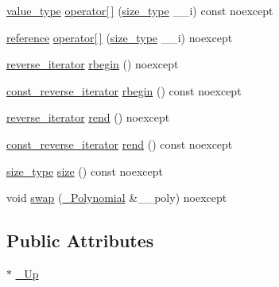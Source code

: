 \begin{DoxyCompactItemize}
\item 
\hyperlink{class____gnu__cxx_1_1__Polynomial_a725563351f50e76084a7a016c06f8a53}{value\+\_\+type} \hyperlink{class____gnu__cxx_1_1__Polynomial_adda717f35cc87205daf0ea7a16d5d1a7}{operator\mbox{[}$\,$\mbox{]}} (\hyperlink{class____gnu__cxx_1_1__Polynomial_a6afe219c123c7a2fdc5abac8a6639053}{size\+\_\+type} \+\_\+\+\_\+i) const noexcept
\item 
\hyperlink{class____gnu__cxx_1_1__Polynomial_accb3b4df60e4ad82d466173d54ea731a}{reference} \hyperlink{class____gnu__cxx_1_1__Polynomial_a999ee3c5a82fe4b2fa39b7a237ff2cbf}{operator\mbox{[}$\,$\mbox{]}} (\hyperlink{class____gnu__cxx_1_1__Polynomial_a6afe219c123c7a2fdc5abac8a6639053}{size\+\_\+type} \+\_\+\+\_\+i) noexcept
\item 
\hyperlink{class____gnu__cxx_1_1__Polynomial_aed8f7d97c575d5c34c54170631953415}{reverse\+\_\+iterator} \hyperlink{class____gnu__cxx_1_1__Polynomial_a10924e0d5e228684c721a4bba73a7af3}{rbegin} () noexcept
\item 
\hyperlink{class____gnu__cxx_1_1__Polynomial_a2a042a80127ab9a7b0349a54791e59af}{const\+\_\+reverse\+\_\+iterator} \hyperlink{class____gnu__cxx_1_1__Polynomial_ab5cd3c6e861ebf3adac38e3df4e099aa}{rbegin} () const noexcept
\item 
\hyperlink{class____gnu__cxx_1_1__Polynomial_aed8f7d97c575d5c34c54170631953415}{reverse\+\_\+iterator} \hyperlink{class____gnu__cxx_1_1__Polynomial_a8373c6b9a787a52798e4319906858d33}{rend} () noexcept
\item 
\hyperlink{class____gnu__cxx_1_1__Polynomial_a2a042a80127ab9a7b0349a54791e59af}{const\+\_\+reverse\+\_\+iterator} \hyperlink{class____gnu__cxx_1_1__Polynomial_abeca4b1cffc4a52db34375b99b6d3d11}{rend} () const noexcept
\item 
\hyperlink{class____gnu__cxx_1_1__Polynomial_a6afe219c123c7a2fdc5abac8a6639053}{size\+\_\+type} \hyperlink{class____gnu__cxx_1_1__Polynomial_aa0ae73f79d58962dc4f1e4df2d2cc0d2}{size} () const noexcept
\item 
void \hyperlink{class____gnu__cxx_1_1__Polynomial_aec8b248101f7340d46fbac13b07b45bc}{swap} (\hyperlink{class____gnu__cxx_1_1__Polynomial}{\+\_\+\+Polynomial} \&\+\_\+\+\_\+poly) noexcept
\end{DoxyCompactItemize}
\subsection*{Public Attributes}
\begin{DoxyCompactItemize}
\item 
$\ast$ \hyperlink{class____gnu__cxx_1_1__Polynomial_a242114d4b86648a5dff67a8221f80d40}{\+\_\+\+Up}
\end{DoxyCompactItemize}
